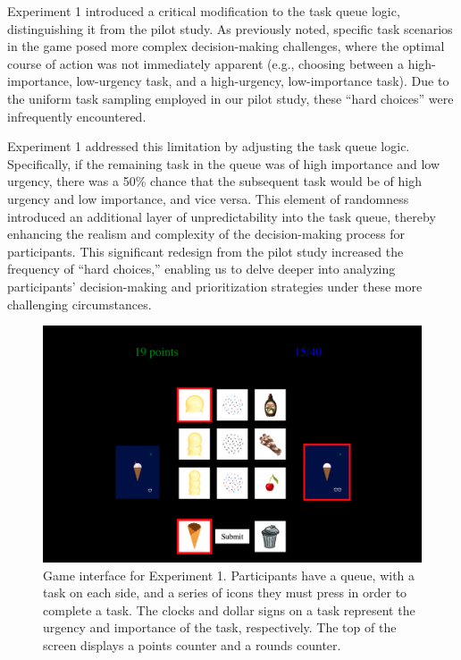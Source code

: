 \documentclass[
]{report}
\begin{document}
Experiment 1 introduced a critical modification to the task queue logic,
distinguishing it from the pilot study. As previously noted, specific
task scenarios in the game posed more complex decision-making
challenges, where the optimal course of action was not immediately
apparent (e.g., choosing between a high-importance, low-urgency task,
and a high-urgency, low-importance task). Due to the uniform task
sampling employed in our pilot study, these ``hard choices'' were
infrequently encountered.

Experiment 1 addressed this limitation by adjusting the task queue
logic. Specifically, if the remaining task in the queue was of high
importance and low urgency, there was a 50\% chance that the subsequent
task would be of high urgency and low importance, and vice versa. This
element of randomness introduced an additional layer of unpredictability
into the task queue, thereby enhancing the realism and complexity of the
decision-making process for participants. This significant redesign from
the pilot study increased the frequency of ``hard choices,'' enabling us
to delve deeper into analyzing participants' decision-making and
prioritization strategies under these more challenging circumstances.

\begin{figure}

{\centering \includegraphics{images/exp_example.png}

}

\caption{Game interface for Experiment 1. Participants have a queue,
with a task on each side, and a series of icons they must press in order
to complete a task. The clocks and dollar signs on a task represent the
urgency and importance of the task, respectively. The top of the screen
displays a points counter and a rounds counter.}

\end{figure}
\end{document}
